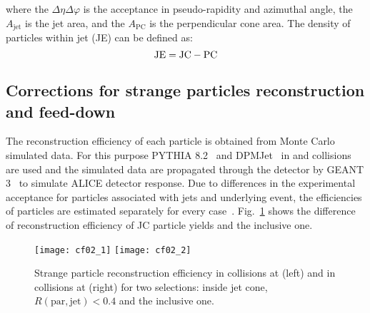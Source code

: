 \documentclass[ALICE,manyauthors]{cernphprep}
\begin{document}
where the $\Delta\eta\Delta\varphi$ is the acceptance in pseudo-rapidity and azimuthal angle, the $A_\mathrm{jet}$ is the jet area, and the $A_\mathrm{PC}$ is the perpendicular cone area.
The density of particles within jet (JE) can be defined as:
\begin{equation}
	{\rm JE = JC - PC}
\end{equation}

\subsection{Corrections for strange particles reconstruction and feed-down}
\label{SubSec:Correction}
The reconstruction efficiency of each particle is obtained from Monte Carlo simulated data.
For this purpose PYTHIA 8.2~\cite{Sjostrand:2014zea} and DPMJet~\cite{Roesler:2000he} in \pp and \pPb collisions are used and the simulated data are propagated through the detector by GEANT 3~\cite{Brun:1994aa} to simulate ALICE detector response.
Due to differences in the experimental acceptance for particles associated with jets and underlying event, the efficiencies of particles are estimated separately for every case~\cite{Acharya:2021oaa}.
Fig.~\ref{fig:EffiJCIncl} shows the difference of reconstruction efficiency of JC particle yields and the inclusive one.
\begin{figure}[!ht]
	\begin{center}
		\texttt{[image: cf02\_1]}
		\texttt{[image: cf02\_2]}
	\end{center}
	\caption{Strange particle reconstruction efficiency in \pp collisions at \thirteen (left) and in \pPb collisions at \fivenn (right) for two selections: inside jet cone, $R(\mathrm{par, jet}) < 0.4$ and the inclusive one.}
	\label{fig:EffiJCIncl}
\end{figure}
\end{document}
